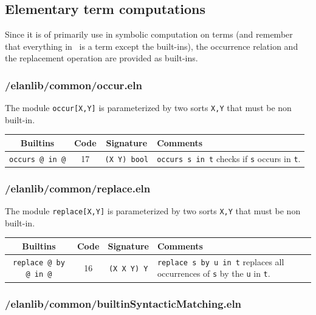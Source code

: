 \subsection{Elementary term computations}

Since it is of primarily use in symbolic computation on terms (and
remember that everything in \elan\ is a term except the built-ins),
the occurrence relation and the replacement operation are provided
as built-ins.

\subsubsection{/elanlib/common/occur.eln}


The module {\tt occur[X,Y]} is parameterized by two sorts {\tt X,Y}
that must be non built-in.\\


\noindent \begin{tabular}{|c|c|c|p{9cm}|}
\hline
{\bf Builtins} & {\bf Code} & {\bf Signature} & {\bf Comments} \\
\hline
\hline
{\tt occurs @ in @}   & 17 & {\tt (X Y) bool} & {\tt occurs s in t} checks if {\tt s} occurs in {\tt t}.\\
\hline
\end{tabular}

\subsubsection{/elanlib/common/replace.eln}


The module {\tt replace[X,Y]} is parameterized by two sorts {\tt X,Y}
that must be non built-in.\\


\noindent \begin{tabular}{|c|c|c|p{8cm}|}
\hline
{\bf Builtins} & {\bf Code} & {\bf Signature} & {\bf Comments} \\
\hline
\hline
{\tt replace @ by @ in @}     & 16 & {\tt (X X Y) Y} & {\tt replace s by u in t} replaces all occurrences of {\tt s} by the {\tt u} in {\tt t}.\\
\hline
\end{tabular}


\subsubsection{/elanlib/common/builtinSyntacticMatching.eln}

